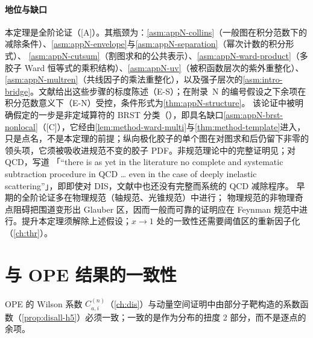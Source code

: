 \paragraph{地位与缺口}
本定理是全阶论证（[A]）。其瓶颈为：\cref{asm:appN-collins}（一般图在积分范数下的减除条件）、\cref{asm:appN-envelope}与\cref{asm:appN-separation}（幂次计数的积分形式）、
\cref{asm:appN-cutsum}（割图求和的公共表示）、\cref{asm:appN-ward-product}（多胶子 Ward 恒等式的乘积结构）、\cref{asm:appN-uv}（被积函数层次的紫外重整化）、
\cref{asm:appN-multren}（共线因子的乘法重整化），以及强子层次的\cref{asm:intro-bridge}。文献给出这些步骤的标度陈述（E-S）；在附录~N 的编号假设之下余项在积分范数意义下（E-N）受控，条件形式为\cref{thm:appN-structure}。
该论证中被明确假定的一步是非定域算符的 BRST 分类（\cite[第~11.3.2~节，第~407--410~页]{Collins2011}），即具名缺口\cref{asm:appN-brst-nonlocal}（[C]），它经由\cref{lem:method-ward-multi}与\cref{thm:method-template}进入，
只是点名，不是本定理的前提；纵向极化胶子的单个图在对图求和后仍留下非零的领头项，它须被吸收进规范不变的胶子 PDF\cite{Collins:2008sg}。非规范理论中的完整证明见\cite[第~8.9~节]{Collins2011}；对 QCD，\cite[第~10.1~节]{CollinsSoperSterman1989}写道
「“there is as yet in the literature no complete and systematic subtraction procedure in QCD \ldots{} even in the case of deeply inelastic scattering”」，即即使对 DIS，文献中也还没有完整而系统的 QCD 减除程序。
早期的全阶论证\cite{EllisEtAl1979,Ellis:1978sf,AmatiPetronzioVeneziano1978a,AmatiPetronzioVeneziano1978b,Mueller1978,CurciFurmanskiPetronzio1980}多在物理规范（轴规范、光锥规范）中进行；
物理规范的非物理奇点阻碍把围道变形出 Glauber 区，因而一般而可靠的证明应在 Feynman 规范中进行\cite[第~12.6~节]{Collins2011}。提升本定理须解除上述假设；$x\to1$ 处的一致性还需要阈值区的重新因子化（\cref{ch:thr}）。

\section{与 OPE 结果的一致性}\label{sec:disall-consistency}

OPE 的 Wilson 系数 $C^{(n)}_{a,i}$（\cref{ch:dis}）与动量空间证明中由部分子靶构造的系数函数（\cref{prop:disall-h5}）必须一致；一致的是作为分布的扭度 2 部分，而不是逐点的余项。

